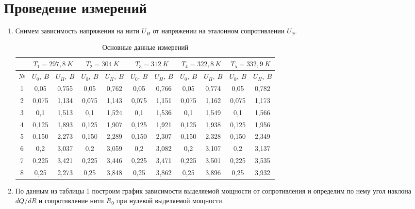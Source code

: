 \documentclass[a4paper,12pt]{article} %
\begin{document}
\section{Проведение измерений}
\begin{enumerate}
	\item Снимем зависимость напряжения на нити $ U_H $ от напряжении
	на эталонном сопротивлении $ U_Э $.
\begin{table}[!h]\centering
	\begin{tabular}{ccccccccccc}
		\hline 
		&\multicolumn{2}{c}{$ T_1=297,8~K $}  
		&\multicolumn{2}{c}{$ T_2=304~K $}  
		&\multicolumn{2}{c}{$ T_3=312~K $}  
		&\multicolumn{2}{c}{$ T_4=322,8~K $}  
		&\multicolumn{2}{c}{$ T_5	=332,9~K $}  \\ 
		\hline 
		$№ $&$ U_0,~B $  &$ U_H,~B $  &$ U_0,~B $  &$ U_H,~B $  
		&$ U_0,~B $  &$ U_H,~B $  &$ U_0,~B $  &$ U_H,~B $
		&$ U_0,~B $  &$ U_H,~B $  \\
		\hline
		1&0,05  &0,755  
		&0,05  &0,762  
		&0,05  &0,766
		&0,05  &0,774
		&0,05  &0,782  \\ 
		2&0,075  &1,134  
		&0,075  &1,143  
		&0,075  &1,151
		&0,075  &1,162
		&0,075  &1,173  \\ 
		3&0,1  &1,513  
		&0,1  &1,524  
		&0,1  &1,536
		&0,1  &1,549
		&0,1  &1,566  \\ 
		4&0,125  &1,893
		&0,125  &1,907
		&0,125  &1,921
		&0,125  &1,938
		&0,125  &1,956  \\ 
		5&0,150  &2,273  
		&0,150  &2,289
		&0,150  &2,307
		&0,150  &2,328
		&0,150  &2,349  \\ 
		6&0,2  &3,037
		&0,2  &3,059
		&0,2  &3,082
		&0,2  &3,107
		&0,2  &3,137  \\
		7&0,225  &3,421
		&0,225  &3,446  
		&0,225  &3,471  
		&0,225  &3,501
		&0,225  &3,535  \\ 
		8&0,25  &2,273  
		&0,25  &3,848  
		&0,25  &3,862
		&0,25  &3,896
		&0,25  &3,932  \\ 
		\hline 
	\end{tabular} 
\caption{Основные данные измерений}
\end{table}
\item По данным из таблицы 1 построим график зависимости
выделяемой мощности от сопротивления и определим по нему угол наклона
$ dQ/dR $ и сопротивление нити $ R_0 $ при нулевой выделяемой
мощности.
\begin{figure}[!h]\centering\small
\end{figure}
\end{enumerate}
\end{document}

